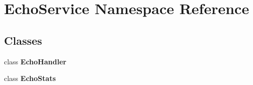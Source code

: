 \section{Echo\+Service Namespace Reference}
\label{namespaceEchoService}
\subsection*{Classes}
\begin{DoxyCompactItemize}
\item 
class {\bf Echo\+Handler}
\item 
class {\bf Echo\+Stats}
\end{DoxyCompactItemize}
